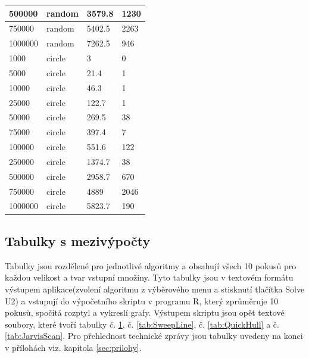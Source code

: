 \documentclass[12pt]{article}
\begin{document}
\begin{table}[h!]
\begin{tabular}{|l|l|l|l|}
500000  & random & 3579.8                    & 1230              \\ \hline
750000  & random & 5402.5                    & 2263              \\ \hline
1000000 & random & 7262.5                    & 946               \\ \hline
1000    & circle & 3                         & 0                 \\ \hline
5000    & circle & 21.4                      & 1                 \\ \hline
10000   & circle & 46.3                      & 1                 \\ \hline
25000   & circle & 122.7                     & 1                 \\ \hline
50000   & circle & 269.5                     & 38                \\ \hline
75000   & circle & 397.4                     & 7                 \\ \hline
100000  & circle & 551.6                     & 122               \\ \hline
250000  & circle & 1374.7                    & 38                \\ \hline
500000  & circle & 2958.7                    & 670               \\ \hline
750000  & circle & 4889                      & 2046              \\ \hline
1000000 & circle & 5823.7                    & 190               \\ \hline
\end{tabular}
\label{tab:GrahamScan}
\end{table}

\clearpage

\subsection{Tabulky s mezivýpočty}
Tabulky jsou rozdělené pro jednotlivé algoritmy a obsahují všech 10 pokusů pro každou velikost a tvar vstupní množiny. Tyto tabulky jsou v textovém formátu výstupem aplikace(zvolení algoritmu z výběrového menu a stisknutí tlačítka Solve U2) a vstupují do výpočetního skriptu v programu R, který zprůměruje 10 pokusů, spočítá rozptyl a vykreslí grafy. Výstupem skriptu jsou opět textové soubory, které tvoří tabulky č. \ref{tab:GrahamScan}, č. \ref{tab:SweepLine}, č. \ref{tab:QuickHull} a č. \ref{tab:JarvisScan}. Pro přehlednost technické zprávy jsou tabulky uvedeny na konci v přílohách viz. kapitola \ref{sec:prilohy}.
\end{document}
